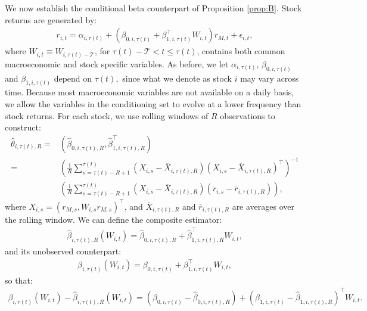 We now establish the conditional beta counterpart of Proposition \ref{prop:B}. Stock returns are generated by:
\begin{align*}
    r_{i,t} = \alpha _{i,\tau(t) }+\left( \beta_{0,i,\tau(t) }+\beta _{1,i,\tau(t)}^{\top} W_{i,t}\right) r_{M,t} + \epsilon_{i,t},
\end{align*}
where $W_{i,t} \equiv W_{i,\tau(t)-\mathcal{T}}$, for $\tau(t) - \mathcal{T} < t \leq \tau(t)$, contains both common macroeconomic and stock specific variables. As before, we let $\alpha_{i,\tau(t) }$, $\beta _{0,i,\tau(t) }$ and $\beta_{1,i,\tau(t)}$ depend on $\tau(t),$ since what we denote as stock $i$ may vary across time. Because most macroeconomic variables are not available on a daily basis, we allow the variables in the conditioning set to evolve at a lower frequency than stock returns. For each stock, we use rolling windows of $R$ observations to construct: 
\begin{align*}
    \widehat{\theta}_{i,\tau(t),R} = &\left( \widehat{\beta}_{0,i,\tau(t),R}, \widehat{\beta}_{1,i,\tau(t),R}^{\top }\right) \\
    =&\left( \frac{1}{R}\sum_{s=\tau(t)-R+1}^{\tau(t)}\left( X_{i,s}-\overline{X}_{i,\tau(t),R}\right) \left( X_{i,s}-\overline{X}_{i,\tau(t),R}\right) ^{\top }\right)^{-1} \\
    &\left( \frac{1}{R}\sum_{s=\tau(t) -R+1}^{\tau(t) }\left( X_{i,s}-\overline{X}_{i,\tau(t),R}\right) \left( r_{i,s}-\overline{r}_{i,\tau(t),R}\right) \right),
\end{align*}
where $X_{i,s}=\left( r_{M,s},W_{i,s}r_{M,s}\right)^\top$, and $\overline{X}_{i,\tau(t),R}$ and $\overline{r}_{i,\tau(t),R}$ are averages over the rolling window. We can define the composite estimator: 
\begin{align}
    \widehat{\beta}_{i,\tau(t),R}\left( W_{i,t}\right) = \widehat{\beta}_{0,i,\tau(t),R} + \widehat{\beta}_{1,i,\tau(t),R}^{\top }W_{i,t},\label{hat-beta}
\end{align}
and its unobserved counterpart:
\begin{align}
    \beta_{i,\tau(t)}\left( W_{i,t}\right) = \beta_{0,i,\tau(t)} + \beta_{1,i,\tau(t)}^{\top }W_{i,t}, \label{beta}
\end{align}
so that:
\begin{align*}
    \beta_{i,\tau(t)}\left( W_{i,t}\right) - \widehat{\beta}_{i,\tau(t),R}\left( W_{i,t}\right) = \left( \beta_{0,i,\tau(t)}-\widehat{\beta}_{0,i,\tau(t),R}\right) + \left( \beta_{1,i,\tau(t)}-\widehat{\beta}_{1,i,\tau(t),R}\right)^{\top} W_{i,t}.
\end{align*}

